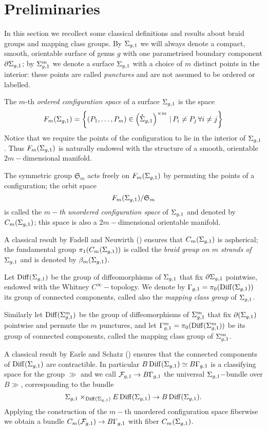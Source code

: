 \section{Preliminaries}
In this section we recollect some classical definitions and results about braid groups and mapping class groups.
By $\Sigma_{g,1}$ we will always denote a compact, smooth, orientable surface of genus $g$ with one parametrised
boundary component $\partial \Sigma_{g,1}$; by $\Sigma_{g,1}^m$ we denote a surface $\Sigma_{g,1}$ with a choice of $m$ distinct
points in the interior: these points are called \emph{punctures} and are not assumed to be ordered
or labelled.

\begin{defn}
\label{defn:cms}
 The $m$-th \emph{ordered configuration space} of a surface $\Sigma_{g,1}$ is the space
\[
 F_m(\Sigma_{g,1})=\left\{(P_1,\dots,P_m) \in \left(\mathring{\Sigma}_{g,1}\right)^{\times m}  \,|\,  P_i\neq P_j  \,\forall i\neq j\right\}
\]
 Notice that we require the points of the configuration to lie in the interior of $\Sigma_{g,1}$.
 Thus $F_m(\Sigma_{g,1})$ is naturally endowed with the structure of a smooth, orientable $2m-$dimensional
 manifold.
 
 The symmetric group $\mathfrak{S}_m$ acts freely on $F_m(\Sigma_{g,1})$ by permuting the points of a configuration;
 the orbit space
 \[
 F_m(\Sigma_{g,1})/\mathfrak{S}_m
 \]
 is called the \emph{$m-$th unordered configuration space}
 of $\Sigma_{g,1}$ and denoted by $C_m(\Sigma_{g,1})$; this space is also a $2m-$dimensional orientable manifold.
 
%  
\end{defn}

A classical result by Fadell and Neuwirth (\cite{FadellNeuwirth}) ensures
that $C_m(\Sigma_{g,1})$ is aspherical; the fundamental group $\pi_1(C_m(\Sigma_{g,1}))$ is
called the \emph{braid group on $m$ strands of $\Sigma_{g,1}$} and is denoted by $\beta_{m}(\Sigma_{g,1})$.

\begin{defn}
 \label{def:mcg}
 Let $\operatorname{Diff}(\Sigma_{g,1})$ be the group of diffeomorphisms of $\Sigma_{g,1}$ that fix $\partial\Sigma_{g,1}$ pointwise,
 endowed with the Whitney $C^{\infty}-$topology. We denote by $\Gamma_{g,1}=\pi_0(\operatorname{Diff}(\Sigma_{g,1}))$ its group of connected
 components, called also the \emph{mapping class group} of $\Sigma_{g,1}$.
 
 Similarly let $\operatorname{Diff}(\Sigma_{g,1}^m)$ be the group of diffeomorphisms of $\Sigma_{g,1}^m$ that fix $\partial(\Sigma_{g,1})$
 pointwise and permute the $m$ punctures, and let $\Gamma_{g,1}^m=\pi_0(\operatorname{Diff}(\Sigma_{g,1}^m))$ be its
 group of connected components, called the mapping class group of $\Sigma_{g,1}^m$.
 \end{defn}
 A classical result by Earle and Schatz (\cite{EarleSchatz}) ensures that the connected components
 of $\operatorname{Diff}(\Sigma_{g,1})$ are contractible. In particular $B\operatorname{Diff}(\Sigma_{g,1})\simeq B\Gamma_{g,1}$ is a classifying space for
 the group $\gg$ and we call $\mathcal{F}_{g,1}\to B\Gamma_{g,1}$ the universal $\Sigma_{g,1}-$bundle over $B\gg$, corresponding to
 the bundle
 \[
  \Sigma_{g,1}\times_{\operatorname{Diff}(\Sigma_{g,1})}E\operatorname{Diff}(\Sigma_{g,1})\to B\operatorname{Diff}(\Sigma_{g,1}).
 \]
Applying the construction of the $m-$th unordered configuration space fiberwise we obtain a bundle
$C_m(\mathcal{F}_{g,1})\to B\Gamma_{g,1}$ with fiber $C_m(\Sigma_{g,1})$.

